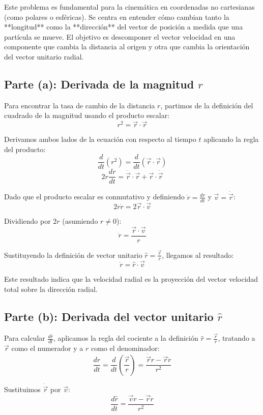 \documentclass[a4paper]{article}
\begin{document}
Este problema es fundamental para la cinemática en coordenadas no cartesianas (como polares o esféricas). Se centra en entender cómo cambian tanto la **longitud** como la **dirección** del vector de posición a medida que una partícula se mueve. El objetivo es descomponer el vector velocidad en una componente que cambia la distancia al origen y otra que cambia la orientación del vector unitario radial.

\subsection{Parte (a): Derivada de la magnitud $r$}

Para encontrar la tasa de cambio de la distancia $r$, partimos de la definición del cuadrado de la magnitud usando el producto escalar:
$$ r^2 = \vec{r} \cdot \vec{r} $$

Derivamos ambos lados de la ecuación con respecto al tiempo $t$ aplicando la regla del producto:
$$ \frac{d}{dt}(r^2) = \frac{d}{dt}(\vec{r} \cdot \vec{r}) $$
$$ 2r \frac{dr}{dt} = \dot{\vec{r}} \cdot \vec{r} + \vec{r} \cdot \dot{\vec{r}} $$

Dado que el producto escalar es conmutativo y definiendo $\dot{r} = \frac{dr}{dt}$ y $\vec{v} = \dot{\vec{r}}$:
$$ 2r\dot{r} = 2\vec{r} \cdot \vec{v} $$

Dividiendo por $2r$ (asumiendo $r \neq 0$):
$$ \dot{r} = \frac{\vec{r} \cdot \vec{v}}{r} $$

Sustituyendo la definición de vector unitario $\hat{r} = \frac{\vec{r}}{r}$, llegamos al resultado:
$$ \dot{r} = \hat{r} \cdot \vec{v} $$

Este resultado indica que la velocidad radial es la proyección del vector velocidad total sobre la dirección radial.

\subsection{Parte (b): Derivada del vector unitario $\hat{r}$}

Para calcular $\frac{d\hat{r}}{dt}$, aplicamos la regla del cociente a la definición $\hat{r} = \frac{\vec{r}}{r}$, tratando a $\vec{r}$ como el numerador y a $r$ como el denominador:
$$ \frac{d\hat{r}}{dt} = \frac{d}{dt} \left( \frac{\vec{r}}{r} \right) = \frac{\dot{\vec{r}}r - \vec{r}\dot{r}}{r^2} $$

Sustituimos $\dot{\vec{r}}$ por $\vec{v}$:
$$ \frac{d\hat{r}}{dt} = \frac{\vec{v}r - \vec{r}\dot{r}}{r^2} $$
\end{document}

